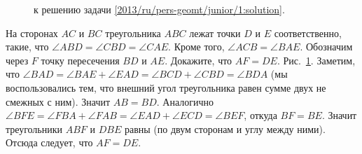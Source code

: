 \ifsolution
\begin{figure}\centering
    \caption{к решению задачи \ref{2013/ru/pers-geomt/junior/1:solution}.}
    \label{2013/ru/pers-geomt/junior/1:solution:fig}
\end{figure}%
\fi %

\problem
На сторонах $AC$ и $BC$ треугольника $ABC$ лежат точки $D$ и $E$
соответственно, такие, что $\angle ABD = \angle CBD = \angle CAE$.
Кроме того, $\angle ACB = \angle BAE$.
Обозначим через $F$ точку пересечения $BD$ и $AE$.
Докажите, что $AF = DE$.
\solution
\label{2013/ru/pers-geomt/junior/1:solution}%
Рис.~\ref{2013/ru/pers-geomt/junior/1:solution:fig}.
Заметим, что
\(
    \angle BAD = \angle BAE + \angle EAD
=
    \angle BCD + \angle CBD = \angle BDA
\)
(мы воспользовались тем, что внешний угол треугольника равен сумме двух не
смежных с ним).
Значит $AB = BD$.
Аналогично
\(
    \angle BFE = \angle FBA + \angle FAB
=
    \angle EAD + \angle ECD = \angle BEF
\), откуда $BF=BE$.
Значит треугольники $ABF$ и $DBE$ равны (по двум сторонам и углу между ними).
Отсюда следует, что $AF = DE$.
\endproblem
